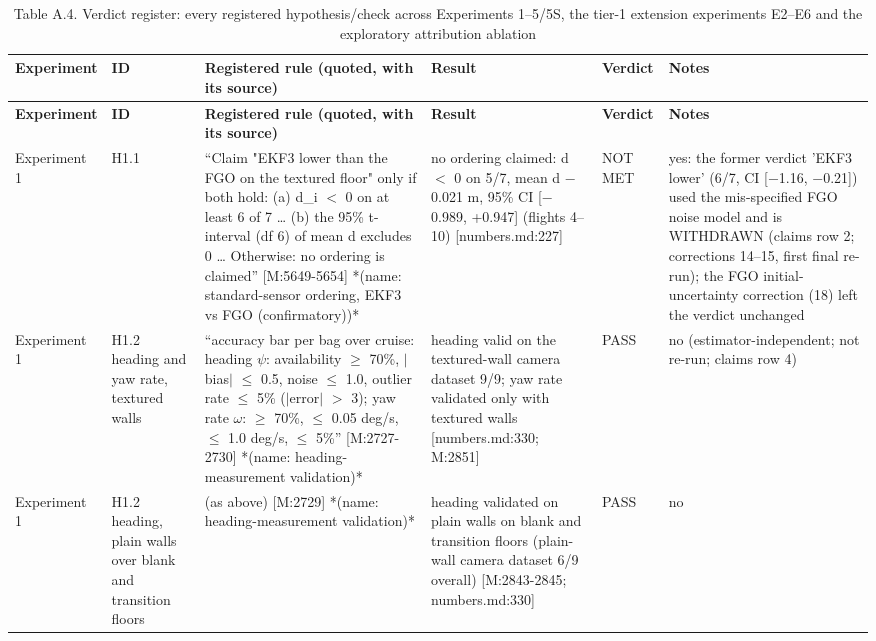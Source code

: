 \footnotesize
\begin{longtable}{p{}p{}p{}p{}p{}p{}}
\caption{Table A.4. Verdict register: every registered hypothesis/check across Experiments 1--5/5S, the tier-1 extension experiments E2--E6 and the exploratory attribution ablation}\label{tab:A-4}\\
\toprule
\textbf{Experiment} & \textbf{ID} & \textbf{Registered rule (quoted, with its source)} & \textbf{Result} & \textbf{Verdict} & \textbf{Notes} \\
\midrule
\endfirsthead
\toprule
\textbf{Experiment} & \textbf{ID} & \textbf{Registered rule (quoted, with its source)} & \textbf{Result} & \textbf{Verdict} & \textbf{Notes} \\
\midrule
\endhead
Experiment 1 & H1.1 & ``Claim "EKF3 lower than the FGO on the textured floor" only if both hold: (a) d\_i $<$ 0 on at least 6 of 7 \ldots{} (b) the 95\% t-interval (df 6) of mean d excludes 0 \ldots{} Otherwise: no ordering is claimed'' [M:5649-5654] *(name: standard-sensor ordering, EKF3 vs FGO (confirmatory))* & no ordering claimed: d $<$ 0 on 5/7, mean d $-$0.021 m, 95\% CI [$-$0.989, +0.947] (flights 4--10) [numbers.md:227] & NOT MET & yes: the former verdict 'EKF3 lower' (6/7, CI [$-$1.16, $-$0.21]) used the mis-specified FGO noise model and is WITHDRAWN (claims row 2; corrections 14--15, first final re-run); the FGO initial-uncertainty correction (18) left the verdict unchanged \\
Experiment 1 & H1.2 heading and yaw rate, textured walls & ``accuracy bar per bag over cruise: heading $\psi$: availability $\ge$ 70\%, $|$bias$|$ $\le$ 0.5\textdegree{}, noise $\le$ 1.0\textdegree{}, outlier rate $\le$ 5\% ($|$error$|$ $>$ 3\textdegree{}); yaw rate $\omega$: $\ge$ 70\%, $\le$ 0.05 deg/s, $\le$ 1.0 deg/s, $\le$ 5\%'' [M:2727-2730] *(name: heading-measurement validation)* & heading valid on the textured-wall camera dataset 9/9; yaw rate validated only with textured walls [numbers.md:330; M:2851] & PASS & no (estimator-independent; not re-run; claims row 4) \\
Experiment 1 & H1.2 heading, plain walls over blank and transition floors & (as above) [M:2729] *(name: heading-measurement validation)* & heading validated on plain walls on blank and transition floors (plain-wall camera dataset 6/9 overall) [M:2843-2845; numbers.md:330] & PASS & no \\

\end{longtable}
